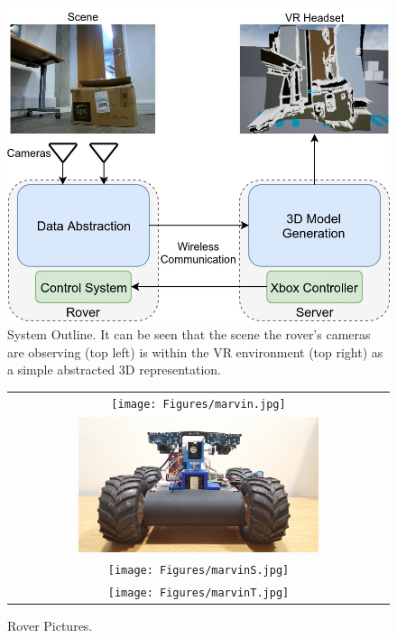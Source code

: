 \begin{figure}[H]
    \begin{center}
      \includegraphics[width=1\textwidth]{Figures/Outline.jpg}
      \caption[System Outline]{System Outline. It can be seen that the scene the rover's cameras are observing (top left) is within the VR environment (top right) as a simple abstracted 3D representation.}
      \label{fig:outline}
    \end{center}
\end{figure}

\begin{figure}[H]
    \begin{center}
      \begin{tabular}{ c }
        \texttt{[image: Figures/marvin.jpg]} \\
        \includegraphics[width=0.65\textwidth]{Figures/marvinF.jpg} \\
        \texttt{[image: Figures/marvinS.jpg]} \\
        \texttt{[image: Figures/marvinT.jpg]}
      \end{tabular}
      \caption[Rover Pictures]{Rover Pictures.}
      \label{fig:marvin}
    \end{center}
\end{figure}